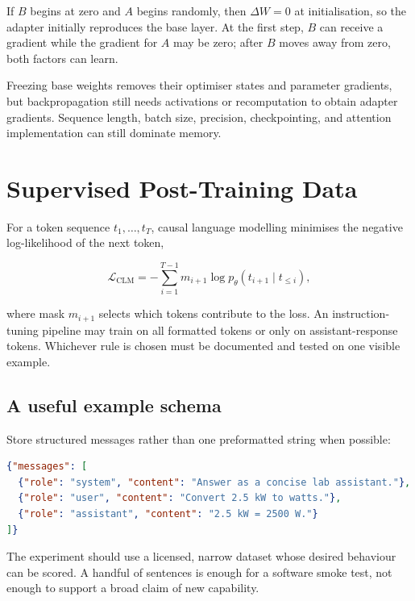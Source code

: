 If $B$ begins at zero and $A$ begins randomly, then $\Delta W=0$ at
initialisation, so the adapter initially reproduces the base layer.
At the first step, $B$ can receive a gradient while the gradient for $A$ may be
zero; after $B$ moves away from zero, both factors can learn.

\begin{cautionbox}
Freezing base weights removes their optimiser states and parameter gradients,
but backpropagation still needs activations or recomputation to obtain adapter
gradients.
Sequence length, batch size, precision, checkpointing, and attention
implementation can still dominate memory.
\end{cautionbox}

\section{Supervised Post-Training Data}

For a token sequence $t_1,\ldots,t_T$, causal language modelling minimises the
negative log-likelihood of the next token,

\begin{equation}
    \mathcal{L}_{\mathrm{CLM}}
    = -\sum_{i=1}^{T-1}
      m_{i+1}\log p_{\theta}(t_{i+1}\mid t_{\leq i}),
    \label{eq:causal-lm-loss}
\end{equation}

where mask $m_{i+1}$ selects which tokens contribute to the loss.
An instruction-tuning pipeline may train on all formatted tokens or only on
assistant-response tokens.
Whichever rule is chosen must be documented and tested on one visible example.

\subsection{A useful example schema}

Store structured messages rather than one preformatted string when possible:

\begin{lstlisting}[language=json]
{"messages": [
  {"role": "system", "content": "Answer as a concise lab assistant."},
  {"role": "user", "content": "Convert 2.5 kW to watts."},
  {"role": "assistant", "content": "2.5 kW = 2500 W."}
]}
\end{lstlisting}

The experiment should use a licensed, narrow dataset whose desired behaviour
can be scored.
A handful of sentences is enough for a software smoke test, not enough to
support a broad claim of new capability.

